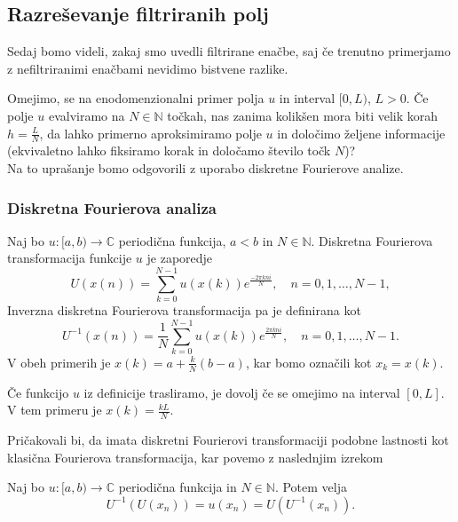\documentclass[mat2, tisk]{fmfdelo}
\newcommand{\N}{\mathbb N}
\newcommand{\C}{\mathbb C}
\begin{document}
\subsection{Razreševanje filtriranih polj}

Sedaj bomo videli, zakaj smo uvedli filtrirane enačbe, saj če 
trenutno primerjamo z nefiltriranimi enačbami nevidimo bistvene razlike.

Omejimo, se na enodomenzionalni primer polja $u$ in interval $[0, L)$, 
$L > 0$. Če polje $u$ evalviramo na $N \in \N$ točkah, nas zanima 
kolikšen mora biti velik korah $h = \frac{L}{N}$, da lahko primerno aproksimiramo 
polje $u$ in določimo željene informacije (ekvivaletno lahko fiksiramo 
korak in določamo število točk $N$)? \\
Na to uprašanje bomo odgovorili z uporabo diskretne Fourierove analize. 

\subsubsection{Diskretna Fourierova analiza}

\begin{definicija}
Naj bo $u: [a, b) \rightarrow \C$ periodična funkcija, $a < b$ in $N\in \N$. 
Diskretna Fourierova transformacija funkcije $u$ je zaporedje 
\begin{equation}
U(x(n)) = \sum_{k=0}^{N-1} u(x(k)) e^{\frac{-2\pi k n i}{N}}, \quad n = 0, 1, \dots, N-1,
\end{equation}
Inverzna diskretna Fourierova
transformacija pa je definirana kot 
\begin{equation}
  U^{-1}(x(n)) = \frac{1}{N}\sum_{k=0}^{N-1} u(x(k)) e^{\frac{2\pi k n i}{N}}, \quad n = 0, 1, \dots, N-1.
\end{equation}
V obeh primerih je $x(k) = a + \frac{k}{N}(b-a)$, kar bomo označili kot
$x_k = x(k)$.
\end{definicija}

\begin{opomba}
Če funkcijo $u$ iz definicije trasliramo, je dovolj če se 
omejimo na interval $[0, L]$. V tem primeru je $x(k) = \frac{kL}{N}$.
\end{opomba}

Pričakovali bi, da imata diskretni Fourierovi transformaciji podobne 
lastnosti kot klasična Fourierova transformacija, kar povemo z naslednjim izrekom 

\begin{izrek}
\label{izrek:iDFT}
Naj bo $u: [a, b) \rightarrow \C$ periodična funkcija in $N\in \N$. Potem velja
\begin{equation}
U^{-1}(U(x_n)) = u(x_n) = U(U^{-1}(x_n)).
\end{equation}
\end{izrek}
\end{document}
